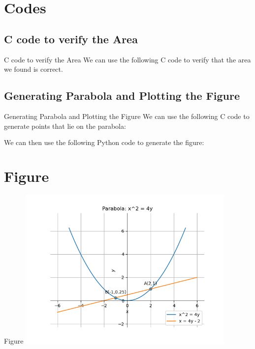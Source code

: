\documentclass{beamer}
\theoremstyle{remark}
\numberwithin{equation}{section}
\begin{document}
\section{Codes}
\subsection{C code to verify the Area}
\begin{frame}{C code to verify the Area}
We can use the following C code to verify that the area we found is correct.


\end{frame}

\subsection{Generating Parabola and Plotting the Figure}
\begin{frame}{Generating Parabola and Plotting the Figure}
    We can use the following C code to generate points that lie on the parabola:



    We can then use the following Python code to generate the figure:

\end{frame}

\section{Figure}
\begin{frame}{Figure}
\includegraphics[width=0.8\textwidth]{figs/plot.png}
\end{frame}
\end{document}
